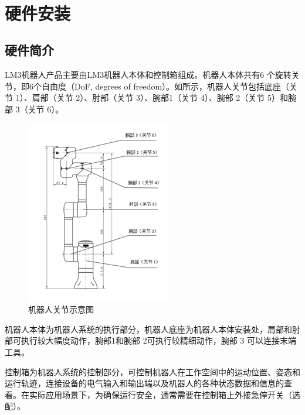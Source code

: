 

 
\section{硬件安装}
\subsection{硬件简介}
 LM3机器人产品主要由LM3机器人本体和控制箱组成。机器人本体共有6 个旋转关节，即6个自由度（DoF, degrees of freedom）。如所示，机器人关节包括底座（关节 1）、肩部（关节 2）、肘部（关节 3）、腕部1（关节 4）、腕部 2（关节 5）和腕部 3（关节 6）。

\begin{figure}[ht]
    \centering
    \includegraphics{image/1-1-joints.png}
    \caption{机器人关节示意图}
    \label{fig:机器人关节示意图}
\end{figure}

机器人本体为机器人系统的执行部分，机器人底座为机器人本体安装处，肩部和肘部可执行较大幅度动作，腕部1和腕部 2可执行较精细动作，腕部 3 可以连接末端工具。

控制箱为机器人系统的控制部分，可控制机器人在工作空间中的运动位置、姿态和运行轨迹，连接设备的电气输入和输出端以及机器人的各种状态数据和信息的查看。在实际应用场景下，为确保运行安全，通常需要在控制箱上外接急停开关（选配）。

